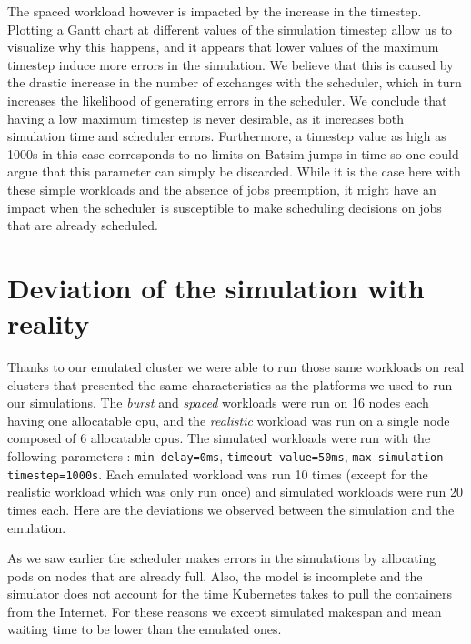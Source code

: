 The spaced workload however is impacted by the increase in the timestep.
Plotting a Gantt chart at different values of the simulation timestep allow us
to visualize why this happens, and it appears that lower values of the maximum
timestep induce more errors in the simulation. We believe that this is caused
by the drastic increase in the number of exchanges with the scheduler, which in
turn increases the likelihood of generating errors in the scheduler. We
conclude that having a low maximum timestep is never desirable, as it increases
both simulation time and scheduler errors. Furthermore, a timestep value as
high as 1000s in this case corresponds to no limits on Batsim jumps in time so
one could argue that this parameter can simply be discarded. While it is the
case here with these simple workloads and the absence of jobs preemption, it
might have an impact when the scheduler is susceptible to make scheduling
decisions on jobs that are already scheduled.

\section{Deviation of the simulation with reality}

Thanks to our emulated cluster we were able to run those same workloads on real
clusters that presented the same characteristics as the platforms we used to
run our simulations. The \textit{burst} and \textit{spaced} workloads were run
on 16 nodes each having one allocatable cpu, and the \textit{realistic}
workload was run on a single node composed of 6 allocatable cpus. The simulated
workloads were run with the following parameters : \texttt{min-delay=0ms},
\texttt{timeout-value=50ms}, \texttt{max-simulation-timestep=1000s}. Each
emulated workload was run 10 times (except for the realistic workload which was
only run once) and simulated workloads were run 20 times each. Here are the
deviations we observed between the simulation and the emulation.

As we saw earlier the scheduler makes errors in the simulations by allocating
pods on nodes that are already full. Also, the model is incomplete and the
simulator does not account for the time Kubernetes takes to pull the containers
from the Internet. For these reasons we except simulated makespan and mean
waiting time to be lower than the emulated ones.

